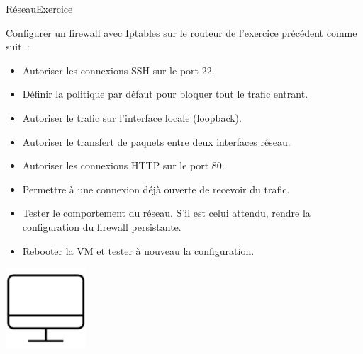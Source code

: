 \documentclass{beamer}
\begin{document}
    \begin{frame}{Réseau}{Exercice \execcounterdispinc}
        \begin{footnotesize}
            Configurer un firewall avec Iptables sur le routeur de l'exercice précédent comme suit~:
            \begin{itemize}
                \item Autoriser les connexions SSH sur le port 22.
                \item Définir la politique par défaut pour bloquer tout le trafic entrant.
                \item Autoriser le trafic sur l'interface locale (loopback).
                \item Autoriser le transfert de paquets entre deux interfaces réseau.
                \item Autoriser les connexions HTTP sur le port 80.
                \item Permettre à une connexion déjà ouverte de recevoir du trafic.
                \item Tester le comportement du réseau.
                S'il est celui attendu, rendre la configuration du firewall persistante.
                \item Rebooter la VM et tester à nouveau la configuration.
            \end{itemize}
        \end{footnotesize}
        \begin{center}
            \includegraphics[width=3cm]{image/desktop}
        \end{center}
    \end{frame}
\end{document}
